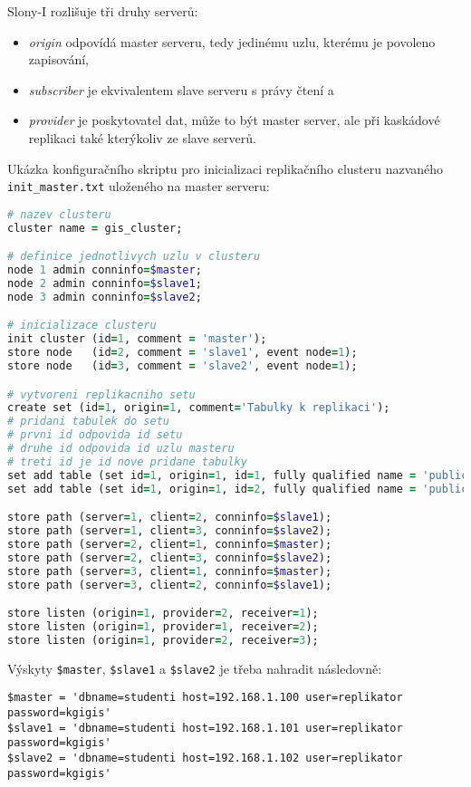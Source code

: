 Slony-I rozlišuje tři druhy serverů:
\begin{itemize}
  \item {\it origin} odpovídá master serveru, tedy jedinému uzlu, kterému je povoleno
    zapisování,
  \item {\it subscriber} je ekvivalentem slave serveru s právy čtení a
  \item {\it provider} je poskytovatel dat, může to být master server, ale při kaskádové
    replikaci také kterýkoliv ze slave serverů.
\end{itemize}

Ukázka konfiguračního skriptu pro i\-ni\-ci\-a\-li\-za\-ci replikačního clusteru nazvaného
\texttt{init\_master.txt} uloženého na master serveru:

\begin{lstlisting}[language=ruby]
# nazev clusteru
cluster name = gis_cluster;

# definice jednotlivych uzlu v clusteru
node 1 admin conninfo=$master;
node 2 admin conninfo=$slave1;
node 3 admin conninfo=$slave2;

# inicializace clusteru
init cluster (id=1, comment = 'master');
store node   (id=2, comment = 'slave1', event node=1);
store node   (id=3, comment = 'slave2', event node=1);

# vytvoreni replikacniho setu
create set (id=1, origin=1, comment='Tabulky k replikaci');
# pridani tabulek do setu
# prvni id odpovida id setu
# druhe id odpovida id uzlu masteru
# treti id je id nove pridane tabulky
set add table (set id=1, origin=1, id=1, fully qualified name = 'public.student', comment='seznam studentu');
set add table (set id=1, origin=1, id=2, fully qualified name = 'public.rodne_mesto', comment='seznam mest');

store path (server=1, client=2, conninfo=$slave1);
store path (server=1, client=3, conninfo=$slave2);
store path (server=2, client=1, conninfo=$master);
store path (server=2, client=3, conninfo=$slave2);
store path (server=3, client=1, conninfo=$master);
store path (server=3, client=2, conninfo=$slave1);

store listen (origin=1, provider=2, receiver=1);
store listen (origin=1, provider=1, receiver=2);
store listen (origin=1, provider=2, receiver=3);
\end{lstlisting}
Výskyty \texttt{\$master}, \texttt{\$slave1} a \texttt{\$slave2} je třeba nahradit
následovně:
\begin{lstlisting}
$master = 'dbname=studenti host=192.168.1.100 user=replikator password=kgigis'
$slave1 = 'dbname=studenti host=192.168.1.101 user=replikator password=kgigis'
$slave2 = 'dbname=studenti host=192.168.1.102 user=replikator password=kgigis'
\end{lstlisting}

